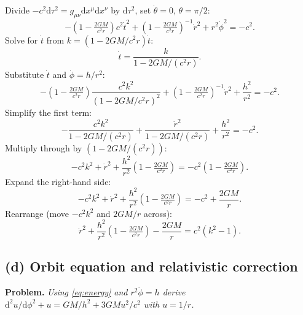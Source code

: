 \documentclass[11pt]{article}
\newcommand{\de}{\mathrm{d}}
\begin{document}
Divide $-c^2\de\tau^2 = g_{\mu\nu}\de x^\mu\de x^\nu$ by $\de\tau^2$, set $\dot\theta=0$, $\theta=\pi/2$:
\[
-\!\left(1-\tfrac{2GM}{c^2 r}\right)c^2\dot t^2 + \!\left(1-\tfrac{2GM}{c^2 r}\right)^{-1}\!\dot r^2 + r^2\dot\phi^2 = -c^2.
\]
Solve for $\dot t$ from $k=(1-2GM/c^2r)\dot t$:
\[
\dot t = \frac{k}{1-2GM/(c^2 r)}.
\]
Substitute $\dot t$ and $\dot\phi = h/r^2$:
\[
-\!\left(1-\tfrac{2GM}{c^2 r}\right)\frac{c^2 k^2}{(1-2GM/c^2 r)^2} + \!\left(1-\tfrac{2GM}{c^2 r}\right)^{-1}\!\dot r^2 + \frac{h^2}{r^2} = -c^2.
\]
Simplify the first term:
\[
-\frac{c^2 k^2}{1-2GM/(c^2 r)} + \frac{\dot r^2}{1-2GM/(c^2 r)} + \frac{h^2}{r^2} = -c^2.
\]
Multiply through by $(1-2GM/(c^2 r))$:
\[
-c^2 k^2 + \dot r^2 + \frac{h^2}{r^2}\!\left(1-\tfrac{2GM}{c^2 r}\right) = -c^2\!\left(1-\tfrac{2GM}{c^2 r}\right).
\]
Expand the right-hand side:
\[
-c^2 k^2 + \dot r^2 + \frac{h^2}{r^2}\!\left(1-\tfrac{2GM}{c^2 r}\right) = -c^2 + \frac{2GM}{r}.
\]
Rearrange (move $-c^2 k^2$ and $2GM/r$ across):
\[
\boxed{\;\dot r^2 + \frac{h^2}{r^2}\!\left(1-\tfrac{2GM}{c^2 r}\right) - \frac{2GM}{r} = c^2(k^2 - 1).\;}
\]
\label{eq:energy}

\subsection*{(d) Orbit equation and relativistic correction}

\textbf{Problem.} \emph{Using \eqref{eq:energy} and $r^2\dot\phi=h$ derive $\de^2 u/\de\phi^2 + u = GM/h^2 + 3GM u^2/c^2$ with $u=1/r$.}
\end{document}
